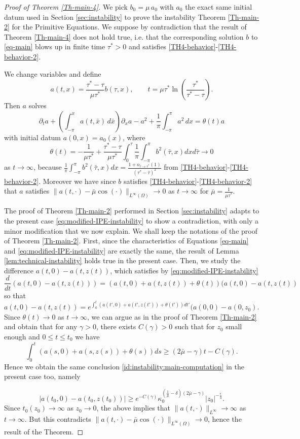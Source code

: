 \documentclass[12pt]{amsart}
\numberwithin{equation}{section}
\numberwithin{equation}{section}
\begin{document}
\begin{proof}[Proof of Theorem \ref{Th-main-4}]

We pick $b_0=\mu \,a_0$ with $a_0$ the exact same initial datum used in Section \ref{sec:instability} to prove the instability Theorem \ref{Th-main-2} for the Primitive Equations. We suppose by contradiction that the result of Theorem \ref{Th-main-4} does not hold true, i.e. that the corresponding solution $b$ to \eqref{eq-main} blows up in finite time $\tau^*>0$ and satisfies \eqref{TH4-behavior}-\eqref{TH4-behavior-2}.

We change variables and define
$$
a(t,x)= \frac{\tau^*-\tau}{\mu \tau^*} b(\tau,x), \qquad t=\mu\tau^* \ln \left(\frac{\tau^*}{\tau^*-\tau}\right).
$$
Then $a$ solves
\begin{equation} \label{eq:modified-IPE-instability}
\partial_t a+  \left(\int_{-\pi}^x a(t, \bar x) \,d\bar x\right) \partial_x a -a^2 +\frac{1}{\pi}  \int_{-\pi}^{\pi}a^
2\,dx= \theta(t)a
\end{equation}
with initial datum $a(0,x)=a_0(x)$, where
$$
\theta(t)= -\frac{1}{\mu\tau^*}+\frac{\tau^*-\tau}{\mu\tau^*}\int_0^\tau \frac{1}{\pi} \int_{-\pi}^\pi b^2(\bar \tau,x)dxd\bar \tau \to 0
$$
as $t\to \infty$, because $ \frac{1}{\pi} \int_{-\pi}^\pi b^2(\bar \tau,x)dx = \frac{1+o_{\bar\tau\to \tau^*}(1)}{(\tau^*-\bar\tau)^2}$ from \eqref{TH4-behavior}-\eqref{TH4-behavior-2}. Moreover we have since $b$ satisfies \eqref{TH4-behavior}-\eqref{TH4-behavior-2} that $a$ satisfies $\|a(t, \cdot)-\bar\mu \cos(\cdot)\|_{L^\infty(\Omega)}\to 0$ as $t\to \infty$ for $\bar\mu=\frac{1}{\mu\tau^*}$.

The proof of Theorem \ref{Th-main-2} performed in Section \ref{sec:instability} adapts to the present case \eqref{eq:modified-IPE-instability} to show a contradiction, with only a minor modification that we now explain. We shall keep the notations of the proof of Theorem \ref{Th-main-2}. First, since the characteristics of Equations \eqref{eq-main} and \eqref{eq:modified-IPE-instability} are exactly the same, the result of Lemma \ref{lem:technical-instability} holds true in the present case. Then, we study the difference $a(t,0)-a(t,z(t))$, which satisfies by \eqref{eq:modified-IPE-instability}
$$
\frac{d}{dt}(a(t,0)-a(t,z(t)))= (a(t,0)+a(t,z(t))+\theta(t))(a(t,0)-a(t,z(t))
$$
so that $a(t,0)-a(t,z(t))=e^{\int_0^t (a(t',0)+a(t',z(t'))+\theta(t'))dt'}(a(0,0)-a(0,z_0)$. Since $\theta(t) \to 0$ as $t\to \infty$, we can argue as in the proof of Theorem \ref{Th-main-2} and obtain that for any $\gamma>0$, there exists $C(\gamma)>0$ such that for $z_0$ small enough and $0\leq t\leq t_0$ we have
$$
\int_0^t \left(a(s,0)+a(s,z(s))+\theta(s)\right)ds\geq (2\bar\mu-\gamma)t  -C(\gamma).
$$
Hence we obtain the same conclusion \eqref{id:instability:main-computation} in the present case too, namely 

$$
 \left|a(t_0,0)-a(t_0,z(t_0))\right|  \geq e^{-C(\gamma)} \kappa_0^{(\frac{1}{\bar\mu}-\delta)(2\bar\mu-\gamma)}  |z_0|^{-\frac{\epsilon}{4}}.
$$
Since $t_0(z_0)\to \infty$ as $z_0\to 0$, the above implies that $\| a(t,\cdot)\|_{L^\infty}\to \infty$ as $t\to \infty$. But this contradicts $\|a(t, \cdot)-\bar\mu \cos(\cdot)\|_{L^\infty(\Omega)}\to 0$, hence the result of the Theorem.
\end{proof}
\end{document}
